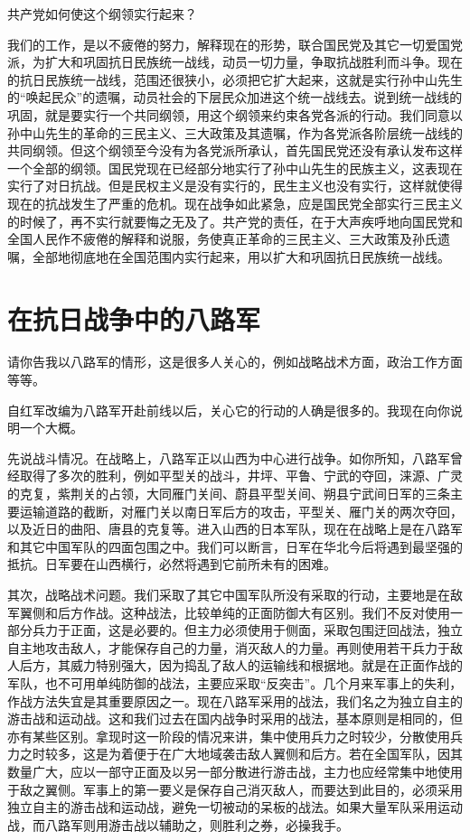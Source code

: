 共产党如何使这个纲领实行起来？

我们的工作，是以不疲倦的努力，解释现在的形势，联合国民党及其它一切爱国党派，为扩大和巩固抗日民族统一战线，动员一切力量，争取抗战胜利而斗争。现在的抗日民族统一战线，范围还很狭小，必须把它扩大起来，这就是实行孙中山先生的“唤起民众”的遗嘱，动员社会的下层民众加进这个统一战线去。说到统一战线的巩固，就是要实行一个共同纲领，用这个纲领来约束各党各派的行动。我们同意以孙中山先生的革命的三民主义、三大政策及其遗嘱，作为各党派各阶层统一战线的共同纲领。但这个纲领至今没有为各党派所承认，首先国民党还没有承认发布这样一个全部的纲领。国民党现在已经部分地实行了孙中山先生的民族主义，这表现在实行了对日抗战。但是民权主义是没有实行的，民生主义也没有实行，这样就使得现在的抗战发生了严重的危机。现在战争如此紧急，应是国民党全部实行三民主义的时候了，再不实行就要悔之无及了。共产党的责任，在于大声疾呼地向国民党和全国人民作不疲倦的解释和说服，务使真正革命的三民主义、三大政策及孙氏遗嘱，全部地彻底地在全国范围内实行起来，用以扩大和巩固抗日民族统一战线。

\section{在抗日战争中的八路军}

请你告我以八路军的情形，这是很多人关心的，例如战略战术方面，政治工作方面等等。

自红军改编为八路军开赴前线以后，关心它的行动的人确是很多的。我现在向你说明一个大概。

先说战斗情况。在战略上，八路军正以山西为中心进行战争。如你所知，八路军曾经取得了多次的胜利，例如平型关的战斗，井坪、平鲁、宁武的夺回，涞源、广灵的克复，紫荆关的占领，大同雁门关间、蔚县平型关间、朔县宁武间日军的三条主要运输道路的截断，对雁门关以南日军后方的攻击，平型关、雁门关的两次夺回，以及近日的曲阳、唐县的克复等。进入山西的日本军队，现在在战略上是在八路军和其它中国军队的四面包围之中。我们可以断言，日军在华北今后将遇到最坚强的抵抗。日军要在山西横行，必然将遇到它前所未有的困难。

其次，战略战术问题。我们采取了其它中国军队所没有采取的行动，主要地是在敌军翼侧和后方作战。这种战法，比较单纯的正面防御大有区别。我们不反对使用一部分兵力于正面，这是必要的。但主力必须使用于侧面，采取包围迂回战法，独立自主地攻击敌人，才能保存自己的力量，消灭敌人的力量。再则使用若干兵力于敌人后方，其威力特别强大，因为捣乱了敌人的运输线和根据地。就是在正面作战的军队，也不可用单纯防御的战法，主要应采取“反突击”。几个月来军事上的失利，作战方法失宜是其重要原因之一。现在八路军采用的战法，我们名之为独立自主的游击战和运动战。这和我们过去在国内战争时采用的战法，基本原则是相同的，但亦有某些区别。拿现时这一阶段的情况来讲，集中使用兵力之时较少，分散使用兵力之时较多，这是为着便于在广大地域袭击敌人翼侧和后方。若在全国军队，因其数量广大，应以一部守正面及以另一部分散进行游击战，主力也应经常集中地使用于敌之翼侧。军事上的第一要义是保存自己消灭敌人，而要达到此目的，必须采用独立自主的游击战和运动战，避免一切被动的呆板的战法。如果大量军队采用运动战，而八路军则用游击战以辅助之，则胜利之券，必操我手。

